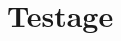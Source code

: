 \documentclass[a4paper,11pt,final]{article}
\begin{document}
  
  \cleardoublepage %
  \tableofcontents %
  \sloppy          %
  \cleardoublepage
  
  \cleardoublepage
  
  \cleardoublepage
  
  \cleardoublepage
  
  \cleardoublepage
  \chapter{Testage}
  \cleardoublepage
  
  \cleardoublepage
  
\end{document}
